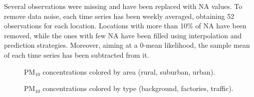 \documentclass[12pt,a4paper]{article}
\begin{document}
Several observations were missing and have been replaced with NA values.  
To remove data noise, each time series has been weekly averaged, obtaining 52 observations for each location. 
Locations with more than 10\% of NA have been removed, while the ones with few NA have been filled using interpolation and prediction strategies.
Moreover, aiming at a 0-mean likelihood, the sample mean of each time series has been subtracted from it.\ 


\begin{figure}[h]
     \centering
     \begin{subfigure}[b]{0.45\textwidth}
         \centering
         
         \label{emilia18}
     \end{subfigure}
     \hfill
     \begin{subfigure}[b]{0.45\textwidth}
         \centering
         
         \label{lombardia18}
     \end{subfigure}
     \hfill
     \caption{ PM$_{10}$ concentrations colored by area (rural, suburban, urban).}
     \label{area}
\end{figure}

\begin{figure}[h]
     \centering
     \begin{subfigure}[b]{0.45\textwidth}
         \centering
         
         \label{emilia18}
     \end{subfigure}
     \hfill
     \begin{subfigure}[b]{0.45\textwidth}
         \centering
         
         \label{lombardia18}
     \end{subfigure}
     \hfill
     \caption{ PM$_{10}$ concentrations colored by type (background, factories, traffic).}
     \label{type}
\end{figure}

\vfill
\end{document}
